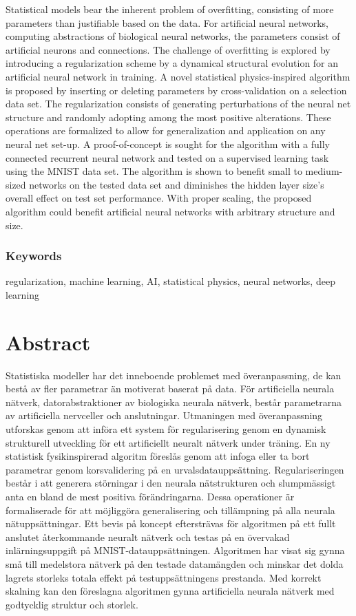 Statistical models bear the inherent problem of overfitting, consisting of more parameters than justifiable based on the data. For artificial neural networks, computing abstractions of biological neural networks, the parameters consist of artificial neurons and connections. The challenge of overfitting is explored by introducing a regularization scheme by a dynamical structural evolution for an artificial neural network in training. A novel statistical physics-inspired algorithm is proposed by inserting or deleting parameters by cross-validation on a selection data set. The regularization consists of generating perturbations of the neural net structure and randomly adopting among the most positive alterations. These operations are formalized to allow for generalization and application on any neural net set-up. A proof-of-concept is sought for the algorithm with a fully connected recurrent neural network and tested on a supervised learning task using the MNIST data set. The algorithm is shown to benefit small to medium-sized networks on the tested data set and diminishes the hidden layer size's overall effect on test set performance. With proper scaling, the proposed algorithm could benefit artificial neural networks with arbitrary structure and size.


\subsection*{Keywords}
regularization, machine learning, AI, statistical physics, neural networks, deep learning


\newpage
\thispagestyle{plain}
\chapter*{Abstract}
Statistiska modeller har det inneboende problemet med överanpassning, de kan bestå av fler parametrar än motiverat baserat på data. För artificiella neurala nätverk, datorabstraktioner av biologiska neurala nätverk, består parametrarna av artificiella nervceller och anslutningar. Utmaningen med överanpassning utforskas genom att införa ett system för regularisering genom en dynamisk strukturell utveckling för ett artificiellt neuralt nätverk under träning. En ny statistisk fysikinspirerad algoritm föreslås genom att infoga eller ta bort parametrar genom korsvalidering på en urvalsdatauppsättning. Regulariseringen består i att generera störningar i den neurala nätstrukturen och slumpmässigt anta en bland de mest positiva förändringarna. Dessa operationer är formaliserade för att möjliggöra generalisering och tillämpning på alla neurala nätuppsättningar. Ett bevis på koncept eftersträvas för algoritmen på ett fullt anslutet återkommande neuralt nätverk och testas på en övervakad inlärningsuppgift på MNIST-datauppsättningen. Algoritmen har visat sig gynna små till medelstora nätverk på den testade datamängden och minskar det dolda lagrets storleks totala effekt på testuppsättningens prestanda. Med korrekt skalning kan den föreslagna algoritmen gynna artificiella neurala nätverk med godtycklig struktur och storlek.

